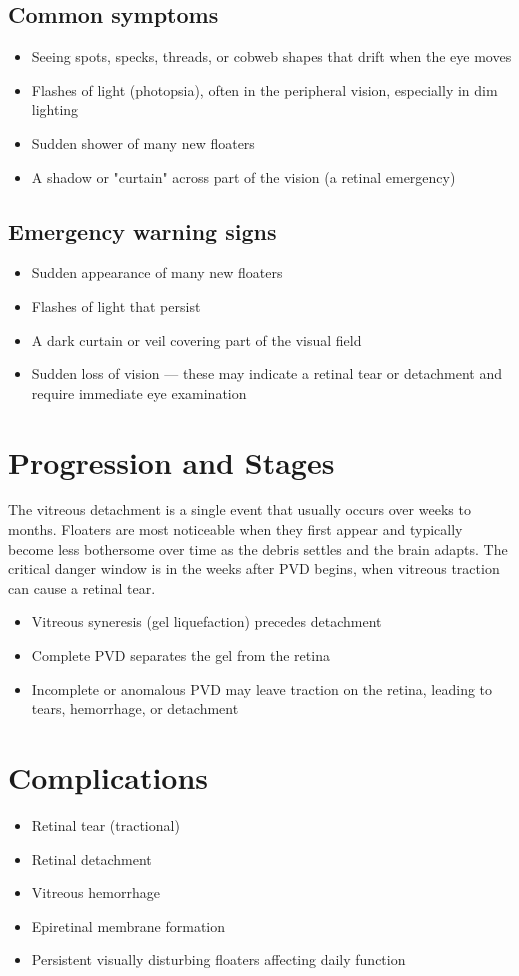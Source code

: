 \subsection{Common symptoms}
\begin{itemize}[noitemsep]
  \item Seeing spots, specks, threads, or cobweb shapes that drift when the eye moves
  \item Flashes of light (photopsia), often in the peripheral vision, especially in dim lighting
  \item Sudden shower of many new floaters
  \item A shadow or "curtain" across part of the vision (a retinal emergency)
\end{itemize}
\subsection{Emergency warning signs}
\begin{itemize}[noitemsep]
  \item Sudden appearance of many new floaters
  \item Flashes of light that persist
  \item A dark curtain or veil covering part of the visual field
  \item Sudden loss of vision --- these may indicate a retinal tear or detachment and require immediate eye examination
\end{itemize}
\section{Progression and Stages}
The vitreous detachment is a single event that usually occurs over weeks to months. Floaters are most noticeable when they first appear and typically become less bothersome over time as the debris settles and the brain adapts. The critical danger window is in the weeks after PVD begins, when vitreous traction can cause a retinal tear.
\begin{itemize}[noitemsep]
  \item Vitreous syneresis (gel liquefaction) precedes detachment
  \item Complete PVD separates the gel from the retina
  \item Incomplete or anomalous PVD may leave traction on the retina, leading to tears, hemorrhage, or detachment
\end{itemize}
\section{Complications}
\begin{itemize}[noitemsep]
  \item Retinal tear (tractional)
  \item Retinal detachment
  \item Vitreous hemorrhage
  \item Epiretinal membrane formation
  \item Persistent visually disturbing floaters affecting daily function
\end{itemize}

